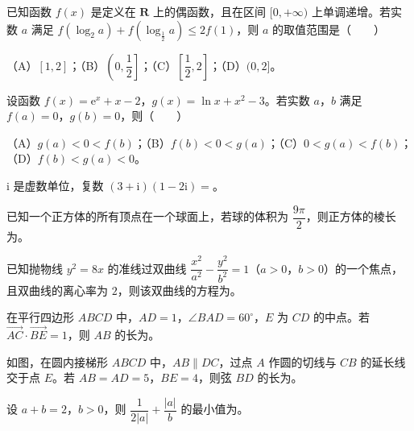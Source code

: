 \begin{question}
已知函数 $f(x)$ 是定义在 $\mathbf R$ 上的偶函数，且在区间 $[0,+\infty)$ 上单调递增。若实数 $a$ 满足 $f(\log_2 a)+f\left(\log_{\frac12}a\right)\leqslant2f(1)$，则 $a$ 的取值范围是\mbox{（　　）}

（A）$[1,2]$；（B）$\left(0,\dfrac12\right]$；（C）$\left[\dfrac12,2\right]$；（D）$(0,2]$。

\end{question}
\begin{question}
设函数 $f(x)=\mathrm e^x+x-2$，$g(x)=\ln x+x^2-3$。若实数 $a$，$b$ 满足 $f(a)=0$，$g(b)=0$，则\mbox{（　　）}

（A）$g(a)<0<f(b)$；（B）$f(b)<0<g(a)$；（C）$0<g(a)<f(b)$；（D）$f(b)<g(a)<0$。

\end{question}

\begin{question}
$\mathrm i$ 是虚数单位，复数 $(3+\mathrm i)(1-2\mathrm i)=$\gkblank{}。

\end{question}
\begin{question}
已知一个正方体的所有顶点在一个球面上，若球的体积为 $\dfrac{9\pi}2$，则正方体的棱长为\gkblank{}。

\end{question}
\begin{question}
已知抛物线 $y^2=8x$ 的准线过双曲线 $\dfrac{x^2}{a^2}-\dfrac{y^2}{b^2}=1$（$a>0$，$b>0$）的一个焦点，且双曲线的离心率为 $2$，则该双曲线的方程为\gkblank{}。

\end{question}
\begin{question}
在平行四边形 $ABCD$ 中，$AD=1$，$\angle BAD=60^\circ$，$E$ 为 $CD$ 的中点。若 $\overrightarrow{AC}\cdot\overrightarrow{BE}=1$，则 $AB$ 的长为\gkblank{}。

\Needspace{0.4\textheight}
\end{question}
\begin{question}
如图，在圆内接梯形 $ABCD$ 中，$AB\parallel DC$，过点 $A$ 作圆的切线与 $CB$ 的延长线交于点 $E$。若 $AB=AD=5$，$BE=4$，则弦 $BD$ 的长为\gkblank{}。
\nopagebreak[4]
\begin{center}\end{center}
\nopagebreak[4]
\end{question}
\begin{question}
设 $a+b=2$，$b>0$，则 $\dfrac1{2|a|}+\dfrac{|a|}b$ 的最小值为\gkblank{}。

\end{question}

